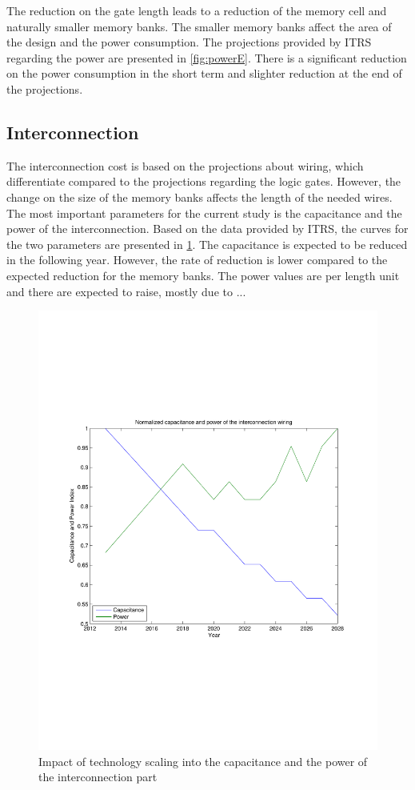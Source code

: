 \documentclass[12pt,a4paper]{article}
\begin{document}
The reduction on the gate length leads to a reduction of the memory cell and naturally smaller memory banks.
The smaller memory banks affect the area of the design and the power consumption.
The projections provided by ITRS regarding the power are presented in \ref{fig:powerE}. 
There is a significant reduction on the power consumption in the short term and slighter reduction at the end of the projections.

\subsection{Interconnection}

The interconnection cost is based on the projections about wiring, which differentiate compared to the projections regarding the logic gates.
However, the change on the size of the memory banks affects the length of the needed wires.
The most important parameters for the current study is the capacitance and the power of the interconnection.
Based on the data provided by ITRS, the curves for the two parameters are presented in \ref{fig:intpowerE}.
The capacitance is expected to be reduced in the following year.
However, the rate of reduction is lower compared to the expected reduction for the memory banks.
The power values are per length unit and there are expected to raise, mostly due to ...

 \begin{figure}[t!]
 \centering
 \includegraphics[width = \textwidth]{intpower.pdf}
  \caption{Impact of technology scaling into the capacitance and the power of the interconnection part}
 \label{fig:intpowerE}
 \end{figure}
\end{document}
